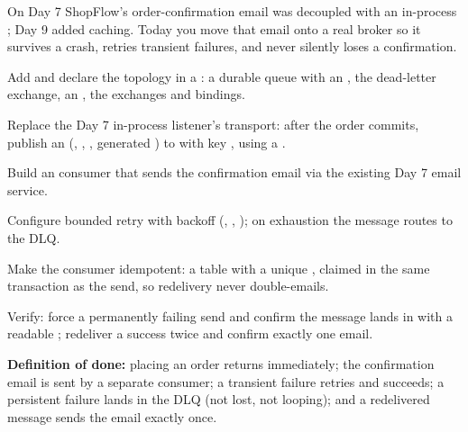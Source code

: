 
On Day 7 ShopFlow's order-confirmation email was decoupled with an in-process ; Day 9 added caching. Today you move that email onto a real broker so it survives a crash, retries transient failures, and never silently loses a confirmation.

\begin{buildalong}
\begin{wbitem}
  \item Add  and declare the topology in a : a durable  queue with an , the  dead-letter exchange, an , the exchanges and bindings.
  \item Replace the Day 7 in-process listener's transport: after the order commits, publish an  (, , , generated ) to  with key , using a .
  \item Build an  consumer that sends the confirmation email via the existing Day 7 email service.
  \item Configure bounded retry with backoff (, , ); on exhaustion the message routes to the DLQ.
  \item Make the consumer idempotent: a  table with a unique , claimed in the same transaction as the send, so redelivery never double-emails.
  \item Verify: force a permanently failing send and confirm the message lands in  with a readable ; redeliver a success twice and confirm exactly one email.
\end{wbitem}
\smallskip\textbf{Definition of done:} placing an order returns immediately; the confirmation email is sent by a separate consumer; a transient failure retries and succeeds; a persistent failure lands in the DLQ (not lost, not looping); and a redelivered message sends the email exactly once.
\end{buildalong}


